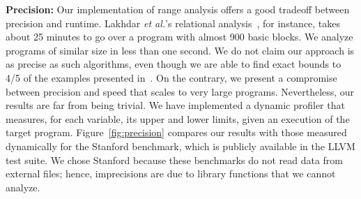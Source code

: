 \documentclass[preprint]{sigplanconf}[10pt]
\begin{document}
\noindent
\textbf{Precision: }
Our implementation of range analysis offers a good tradeoff between
precision and runtime.
Lakhdar {\em et al.}'s relational analysis~\cite{Lakhdar11}, for instance,
takes about 25 minutes to go over a program with almost 900 basic blocks.
We analyze programs of similar size in less than one second.
We do not claim our approach is as precise as such algorithms, even though we
are able to find exact bounds to 4/5 of the examples presented
in~\cite{Lakhdar11}.
On the contrary, we present a compromise between precision and speed
that scales to very large programs.
Nevertheless, our results are far from being trivial.
We have implemented a dynamic profiler that measures, for each variable,
its upper and lower limits, given an execution of the target program.
Figure~\ref{fig:precision} compares our results with those measured
dynamically for the Stanford benchmark, which is publicly
available in the LLVM test suite.
We chose Stanford because these benchmarks do not read data from external
files; hence, imprecisions are due to library functions that we cannot
analyze.
\end{document}

